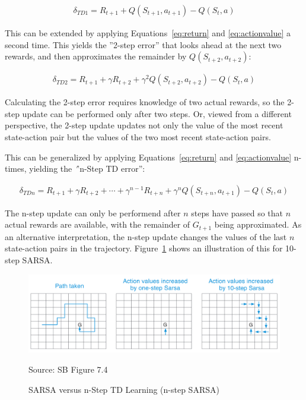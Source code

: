 \begin{align*}
\delta_{TD1} = R_{t+1} + Q(S_{t+1}, a_{t+1}) - Q(S_t, a)
\end{align*}

This can be extended by applying Equations~\ref{eq:return} and \ref{eq:actionvalue} a second time. This yields the ''2-step error'' that looks ahead at the next two rewards, and then approximates the remainder by $Q(S_{t+2}, a_{t+2})$:

\begin{align*}
\delta_{TD2} = R_{t+1} + \gamma R_{t+2} + \gamma^2 Q(S_{t+2}, a_{t+2}) - Q(S_t, a)
\end{align*}

Calculating the 2-step error requires knowledge of two actual rewards, so the 2-step update can be performed only after two steps. Or, viewed from a different perspective, the 2-step update updates not only the value of the most recent state-action pair but the values of the two most recent state-action pairs. 

This can be generalized by applying Equations~\ref{eq:return} and \ref{eq:actionvalue} n-times, yielding the \emph''{n-Step TD error}'':

\begin{align*}
\delta_{TDn} = R_{t+1} + \gamma R_{t+2} + \cdots + \gamma^{n-1} R_{t+n} + \gamma^n Q(S_{t+n}, a_{t+1}) - Q(S_t, a)
\end{align*}

The n-step update can only be performend after $n$ steps have passed so that $n$ actual rewards are available, with the remainder of $G_{t+1}$ being approximated. As an alternative interpretation, the n-step update changes the values of the last $n$ state-action pairs in the trajectory. Figure~\ref{fig:sarsa10step} shows an illustration of this for 10-step SARSA.


\begin{figure}
\centering
\includegraphics[width=\textwidth]{screen7.png}

\scriptsize
Source: SB Figure 7.4
\caption{SARSA versus n-Step TD Learning (n-step SARSA)}
\label{fig:sarsa10step}
\end{figure}


